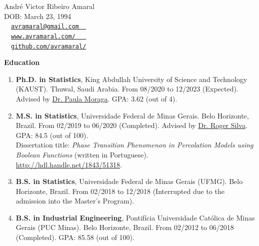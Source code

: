 \documentclass[11pt, ]{article}
\begin{document}
	
	\begin{center}
		{\LARGE André Victor Ribeiro Amaral} \\ \vspace{3pt}
		{\small DOB: March 23, 1994} \\ \vspace{3pt}
		{\small\faEnvelope~~\href{mailto:avramaral@gmail.com}{\texttt{avramaral@gmail.com~~}}} \\
		{\small\faDesktop~~\href{https://www.avramaral.com/}{\texttt{www.avramaral.com/~~~}}}	\\
		{\small\faGithubAlt~~\href{https://github.com/avramaral/}{\texttt{github.com/avramaral/}}}	
	\end{center}
	
	{\Large \textbf{Education}}
	
	\begin{enumerate}
		\item \textbf{Ph.D. in Statistics}, King Abdullah University of Science and Technology (KAUST). Thuwal, Saudi Arabia. From 08/2020 to 12/2023 (Expected). Advised by \href{https://www.paulamoraga.com/}{Dr. Paula Moraga}. GPA: 3.62 (out of 4).
		
		\item \textbf{M.S. in Statistics}, Universidade Federal de Minas Gerais. Belo Horizonte, Brazil. From 02/2019 to 06/2020 (Completed). Advised by \href{http://www.est.ufmg.br/~rogerwcs/}{Dr. Roger Silva}. GPA: 84.5 (out of 100). \\
		Dissertation title: \textit{Phase Transition Phenomenon in Percolation Models using Boolean Functions} (written in Portuguese). \href{http://hdl.handle.net/1843/51318}{\url{http://hdl.handle.net/1843/51318}}.
		
		\item \textbf{B.S. in Statistics}, Universidade Federal de Minas Gerais (UFMG). Belo Horizonte, Brazil. From 02/2018 to 12/2018 (Interrupted due to the admission into the Master's Program).
		
		\item \textbf{B.S. in Industrial Engineering}, Pontifícia Universidade Católica de Minas Gerais (PUC Minas). \hspace{-1pt}Belo Horizonte, \hspace{-1pt}Brazil. \hspace{-1pt}From 02/2012 \hspace{-1pt}to 06/2018 \hspace{-1pt}(Completed). GPA: 85.58 \hspace{-1pt}(out of 100).
		
	\end{enumerate}
	
\end{document}
